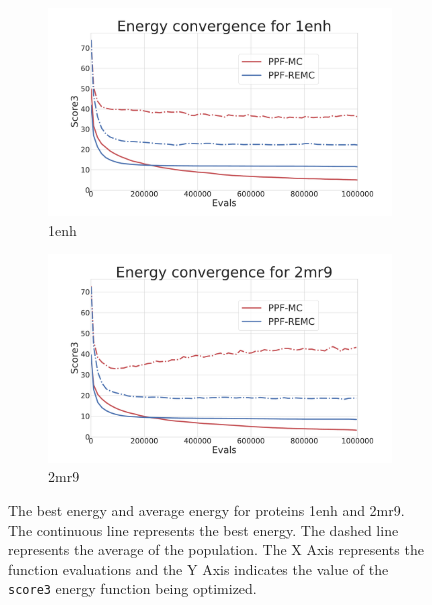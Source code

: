 \begin{figure}[ht]
  \begin{subfigure}{0.499\linewidth}
    \centering
    \includegraphics[width=1\linewidth]{Figuras/plots/energy_convergence/energy_convergence_1enh.pdf}
    \caption{1enh}
    \label{fig:1enh-energy-convergence}
  \end{subfigure}
%
  \begin{subfigure}{0.499\linewidth}
    \centering
    \includegraphics[width=1\linewidth]{Figuras/plots/energy_convergence/energy_convergence_2mr9.pdf}
    \caption{2mr9}
    \label{fig:2mr9-energy-convergence}
  \end{subfigure}
  \caption{The best energy and average energy for proteins 1enh and 2mr9. The
  continuous line represents the best energy. The dashed line represents the
  average of the population. The X Axis represents the function evaluations and
  the Y Axis indicates the value of the \texttt{score3} energy function being
  optimized.}
  \label{fig:energy-convergence-1enh-2mr9}
\end{figure}

